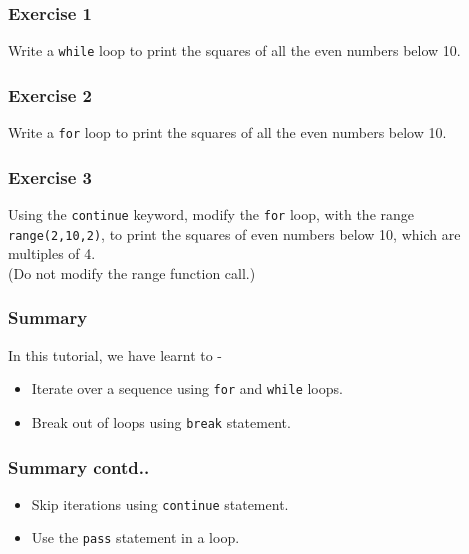 \documentclass[17pt,compress]{beamer}
\begin{document}
\begin{frame}
\frametitle{Exercise 1}
\label{sec-4}

  Write a \texttt{while} loop to print the squares of all the even
  numbers below 10. 
\end{frame}
\begin{frame}
\frametitle{Exercise 2}
\label{sec-5}

  Write a \texttt{for} loop to print the squares of all the even numbers
  below 10.
\end{frame}
\begin{frame}
\frametitle{Exercise 3}
\label{sec-6}

  Using the \texttt{continue} keyword, modify the \texttt{for} loop, with the range \texttt{range(2,10,2)}, to print the squares of even numbers below 10, which are multiples of 4.\\
  (Do not modify the range function call.)
\end{frame}
\begin{frame}
\frametitle{Summary}
\label{sec-7.1}

 In this tutorial, we have learnt to -

\begin{itemize}
\item Iterate over a sequence using \texttt{for} and \texttt{while} loops.
\item Break out of loops using \texttt{break} statement. 
\end{itemize}
\end{frame}
\begin{frame}
\frametitle{Summary contd..}
\label{sec-7.2}

\begin{itemize}
\item Skip iterations using \texttt{continue} statement.
\item Use the \texttt{pass} statement in a loop.
\end{itemize}
\end{frame}
\end{document}
